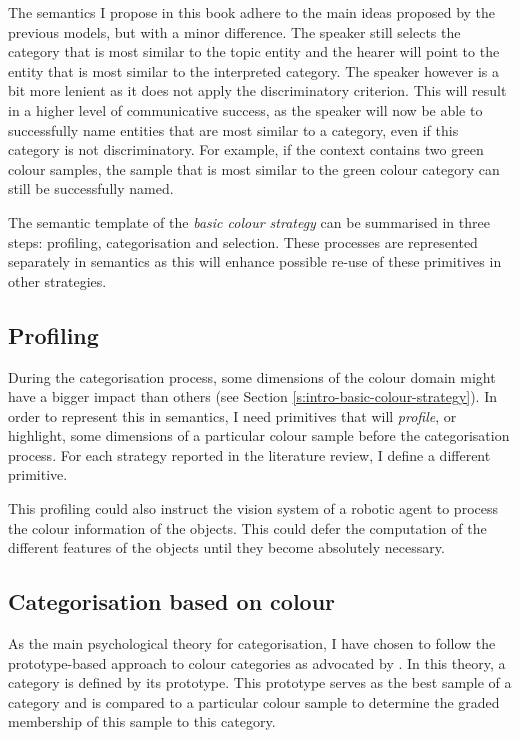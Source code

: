 The semantics I propose in this book adhere to the main ideas
proposed by the previous models, but with a minor difference. The
speaker still selects the category that is most similar to the topic
entity and the hearer will point to the entity that is most similar to
the interpreted category. The speaker however is a bit more lenient as
it does not apply the discriminatory criterion. This will result in a
higher level of communicative success, as the speaker will now be able
to successfully name entities that are most similar to a category,
even if this category is not discriminatory. For example, if the
context contains two green colour samples, the sample that is most
similar to the green colour category can still be successfully
named. 

The semantic template of the \emph{basic colour strategy} can be
summarised in three steps: profiling, categorisation and
selection. These processes are represented separately in semantics as
this will enhance possible re-use of these primitives in other
strategies.

\subsection{Profiling}

During the categorisation process, some dimensions of the colour
domain might have a bigger impact than others (see Section
\ref{s:intro-basic-colour-strategy}). In order to represent this in
semantics, I need primitives that will \emph{profile}, or highlight,
some dimensions of a particular colour sample before the
categorisation process. For each strategy reported in the literature
review, I define a different primitive.

This profiling could also instruct the vision system of a robotic
agent to process the colour information of the objects. This could
defer the computation of the different features of the objects until
they become absolutely necessary.

\subsection{Categorisation based on colour}
\label{s:bcs-categorisation}

As the main psychological theory for categorisation, I have chosen to
follow the prototype-based approach to colour categories as advocated
by \cite{rosch73natural}. In this theory, a category is defined by its
prototype. This prototype serves as the best sample of a category and
is compared to a particular colour sample to determine the graded
membership of this sample to this category.

